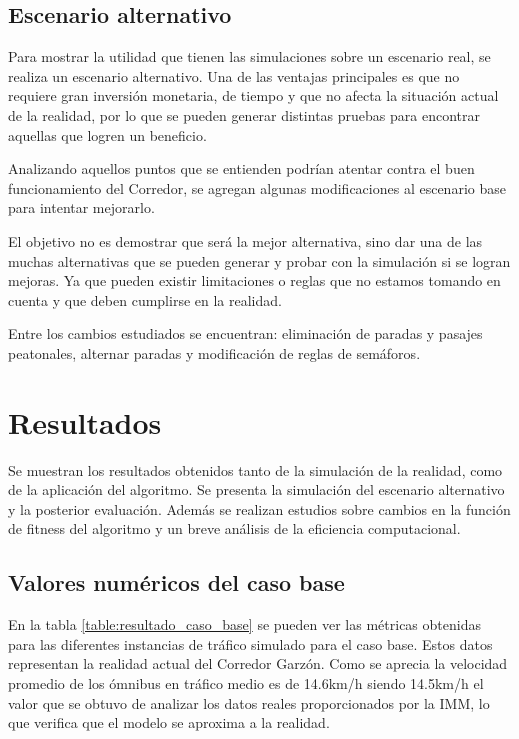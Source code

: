 \subsection{Escenario alternativo}

Para mostrar la utilidad que tienen las simulaciones sobre un escenario real, se realiza un escenario alternativo. Una de las ventajas principales es que no requiere gran inversión monetaria, de tiempo y que no afecta la situación actual de la realidad, por lo que se pueden generar distintas pruebas para encontrar aquellas que logren un beneficio.

Analizando aquellos puntos que se entienden podrían atentar contra el buen funcionamiento del Corredor, se agregan algunas modificaciones al escenario base para intentar mejorarlo. 

El objetivo no es demostrar que será la mejor alternativa, sino dar una de las muchas alternativas que se pueden generar y probar con la simulación si se logran mejoras. Ya que pueden existir limitaciones o reglas que no estamos tomando en cuenta y que deben cumplirse en la realidad.

Entre los cambios estudiados se encuentran: eliminación de paradas y pasajes peatonales, alternar paradas y modificación de reglas de semáforos.



\section{Resultados}
Se muestran los resultados obtenidos tanto de la simulación de la realidad, como de la aplicación del algoritmo. Se presenta la simulación del escenario alternativo y la posterior evaluación. Además se realizan estudios sobre cambios en la función de fitness del algoritmo y un breve análisis de la eficiencia computacional.


\subsection{Valores numéricos del caso base}

En la tabla \ref{table:resultado_caso_base} se pueden ver las métricas obtenidas para las diferentes instancias de tráfico simulado para el caso base. Estos datos representan la realidad actual del Corredor Garzón. Como se aprecia la velocidad promedio de los ómnibus en tráfico medio es de 14.6km/h siendo 14.5km/h el valor que se obtuvo de analizar los datos reales proporcionados por la IMM, lo que verifica que el modelo se aproxima a la realidad. 
 
